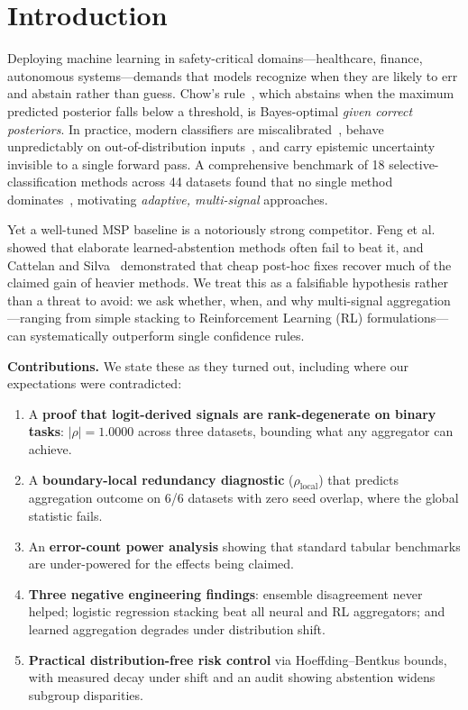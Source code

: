 \documentclass[conference]{IEEEtran}
\begin{document}
\section{Introduction}
\label{sec:intro}

Deploying machine learning in safety-critical domains---healthcare, finance, autonomous systems---demands that models recognize when they are likely to err and abstain rather than guess. Chow's rule~\cite{chow1970}, which abstains when the maximum predicted posterior falls below a threshold, is Bayes-optimal \emph{given correct posteriors}. In practice, modern classifiers are miscalibrated~\cite{guo2017calibration}, behave unpredictably on out-of-distribution inputs~\cite{liu2020energy}, and carry epistemic uncertainty invisible to a single forward pass. A comprehensive benchmark of 18 selective-classification methods across 44 datasets found that no single method dominates~\cite{pugnana2024benchmark}, motivating \emph{adaptive, multi-signal} approaches.

Yet a well-tuned MSP baseline is a notoriously strong competitor. Feng et al.~\cite{feng2023better} showed that elaborate learned-abstention methods often fail to beat it, and Cattelan and Silva~\cite{cattelan2023logitnorm} demonstrated that cheap post-hoc fixes recover much of the claimed gain of heavier methods. We treat this as a falsifiable hypothesis rather than a threat to avoid: we ask whether, when, and why multi-signal aggregation---ranging from simple stacking to Reinforcement Learning (RL) formulations---can systematically outperform single confidence rules.

\textbf{Contributions.} We state these as they turned out, including where our expectations were contradicted:
\begin{enumerate}
  \item A \textbf{proof that logit-derived signals are rank-degenerate on binary tasks}: $|\rho| = 1.0000$ across three datasets, bounding what any aggregator can achieve.
  \item A \textbf{boundary-local redundancy diagnostic} ($\rho_{\mathrm{local}}$) that predicts aggregation outcome on 6/6 datasets with zero seed overlap, where the global statistic fails.
  \item An \textbf{error-count power analysis} showing that standard tabular benchmarks are under-powered for the effects being claimed.
  \item \textbf{Three negative engineering findings}: ensemble disagreement never helped; logistic regression stacking beat all neural and RL aggregators; and learned aggregation degrades under distribution shift.
  \item \textbf{Practical distribution-free risk control} via Hoeffding--Bentkus bounds, with measured decay under shift and an audit showing abstention widens subgroup disparities.
\end{enumerate}
\end{document}
